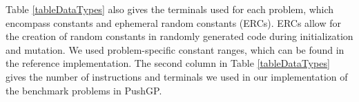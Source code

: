 \documentclass{sig-alternate}
\begin{document}
Table \ref{tableDataTypes} also gives the terminals used for each problem, which encompass constants and ephemeral random constants (ERCs). ERCs allow for the creation of random constants in randomly generated code during initialization and mutation. We used problem-specific constant ranges, which can be found in the reference implementation.
The second column in Table \ref{tableDataTypes} gives the number of instructions and terminals we used in our implementation of the benchmark problems in PushGP. 
\end{document}
